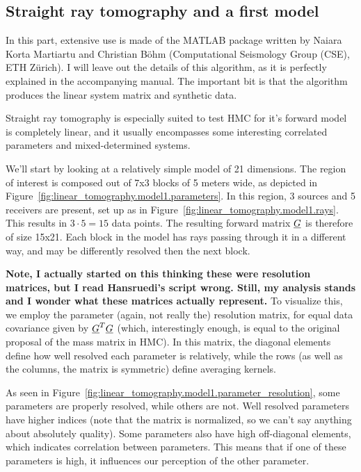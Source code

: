 \subsection{Straight ray tomography and a first model}
In this part, extensive use is made of the MATLAB package written by Naiara Korta Martiartu and Christian B\"ohm (Computational Seismology Group (CSE), ETH Z\"urich). I will leave out the details of this algorithm, as it is perfectly explained in the accompanying manual. The important bit is that the algorithm produces the linear system matrix and synthetic data.

Straight ray tomography is especially suited to test \gls{HMC} for it's forward model is completely linear, and it usually encompasses some interesting correlated parameters and mixed-determined systems. 

We'll start by looking at a relatively simple model of 21 dimensions. The region of interest is composed out of 7x3 blocks of 5 meters wide, as depicted in Figure~\ref{fig:linear_tomography.model1.parameters}. In this region, 3 sources and 5 receivers are present, set up as in Figure~\ref{fig:linear_tomography.model1.rays}. This results in $3 \cdot 5 = 15$ data points. The resulting forward matrix $\underline{G}$ is therefore of size 15x21. Each block in the model has rays passing through it in a different way, and may be differently resolved then the next block.

\textbf{Note, I actually started on this thinking these were resolution matrices, but I read Hansruedi's script wrong. Still, my analysis stands and I wonder what these matrices actually represent.} To visualize this, we employ the parameter (again, not really the) resolution matrix, for equal data covariance given by $\underline{G}^T\underline{G}$ (which, interestingly enough, is equal to the original proposal of the mass matrix in \gls{HMC}). In this matrix, the diagonal elements define how well resolved each parameter is relatively, while the rows (as well as the columns, the matrix is symmetric) define averaging kernels.

As seen in Figure~\ref{fig:linear_tomography.model1.parameter_resolution}, some parameters are properly resolved, while others are not. Well resolved parameters have higher indices (note that the matrix is normalized, so we can't say anything about absolutely quality). Some parameters also have high off-diagonal elements, which indicates correlation between parameters. This means that if one of these parameters is high, it influences our perception of the other parameter.

